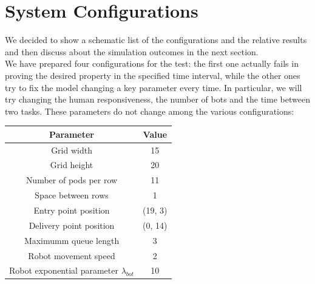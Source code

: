 \documentclass{article}
\begin{document}
	\section{System Configurations}
		We decided to show a schematic list of the configurations and the relative results and then discuss about the simulation outcomes in the next section.\\
		We have prepared four configurations for the test: the first one actually fails in proving the desired property in the specified time interval, while the other ones try to fix the model changing a key parameter every time. In particular, we will try changing the human responsiveness, the number of bots and the time between two tasks.
		These parameters do not change among the various configurations:
		\begin{center}
			\begin{tabular}{ |c|c|}
				\hline
				Parameter & Value \\
				\hline
				\hline
				Grid width & 15\\
				\hline
				Grid height & 20\\
				\hline
				Number of pods per row & 11\\
				\hline
				Space between rows & 1 \\
				\hline
				Entry point position & (19, 3) \\
				\hline
				Delivery point position & (0, 14) \\
				\hline
				Maximumm queue length & 3 \\
				\hline
				Robot movement speed & 2 \\
				\hline
				Robot exponential parameter $\lambda_{bot}$ & 10 \\
				\hline
			\end{tabular}
		\end{center}
			
\end{document}
